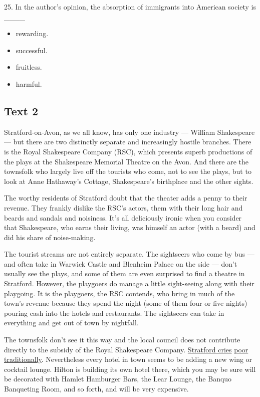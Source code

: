 \documentclass[UTF8,11pt]{ctexart}
\begin{document}
25. In the author’s opinion, the absorption of immigrants into American society is \_\_\_\_


\begin{itemize}[leftmargin=2em,itemsep=.2em,topsep=.4em]\item[A.] rewarding.
\item[B.] successful.
\item[C.] fruitless.
\item[D.] harmful.
\end{itemize}

\subsection*{\textbf{Text 2}}


Stratford-on-Avon, as we all know, has only one industry — William Shakespeare — but there are two distinctly separate and increasingly hostile branches. There is the Royal Shakespeare Company (RSC), which presents superb productions of the plays at the Shakespeare Memorial Theatre on the Avon. And there are the townsfolk who largely live off the tourists who come, not to see the plays, but to look at Anne Hathaway’s Cottage, Shakespeare’s birthplace and the other sights.


The worthy residents of Stratford doubt that the theater adds a penny to their revenue. They frankly dislike the RSC’s actors, them with their long hair and beards and sandals and noisiness. It’s all deliciously ironic when you consider that Shakespeare, who earns their living, was himself an actor (with a beard) and did his share of noise-making.


The tourist streams are not entirely separate. The sightseers who come by bus — and often take in Warwick Castle and Blenheim Palace on the side — don’t usually see the plays, and some of them are even surprised to find a theatre in Stratford. However, the playgoers do manage a little sight-seeing along with their playgoing. It is the playgoers, the RSC contends, who bring in much of the town’s revenue because they spend the night (some of them four or five nights) pouring cash into the hotels and restaurants. The sightseers can take in everything and get out of town by nightfall.


The townsfolk don’t see it this way and the local council does not contribute directly to the subsidy of the Royal Shakespeare Company. \uline{Stratford cries} \uline{poor traditionally}. Nevertheless every hotel in town seems to be adding a new wing or cocktail lounge. Hilton is building its own hotel there, which you may be sure will be decorated with Hamlet Hamburger Bars, the Lear Lounge, the Banquo Banqueting Room, and so forth, and will be very expensive.
\end{document}
